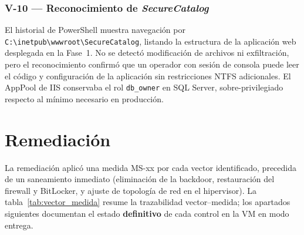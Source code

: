 \subsubsection{V-10 --- Reconocimiento de \textit{SecureCatalog}}
El historial de PowerShell muestra navegación por \texttt{C:\textbackslash}\allowbreak\texttt{inetpub\textbackslash}\allowbreak\texttt{wwwroot\textbackslash}\allowbreak\texttt{SecureCatalog}, listando la estructura de la aplicación web desplegada en la Fase~1. No se detectó modificación de archivos ni exfiltración, pero el reconocimiento confirmó que un operador con sesión de consola puede leer el código y configuración de la aplicación sin restricciones NTFS adicionales. El AppPool de IIS conservaba el rol \texttt{db\_owner} en SQL Server, sobre-privilegiado respecto al mínimo necesario en producción.

\section[Remediación]{Remediación}
\label{sec:remediacion}

La remediación aplicó una medida MS-xx por cada vector identificado, precedida de un saneamiento inmediato (eliminación de la backdoor, restauración del firewall y BitLocker, y ajuste de topología de red en el hipervisor). La tabla~\ref{tab:vector_medida} resume la trazabilidad vector--medida; los apartados siguientes documentan el estado \textbf{definitivo} de cada control en la VM en modo entrega.


